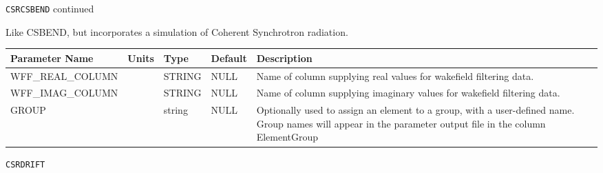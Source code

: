 \newpage
\begin{center}{\Large\verb|CSRCSBEND| continued}\end{center}
Like CSBEND, but incorporates a simulation of Coherent Synchrotron radiation.
\\
\begin{tabular}{|l|l|l|l|p{\descwidth}|} \hline
Parameter Name & Units & Type & Default & Description \\ \hline 
WFF\_REAL\_COLUMN &  & STRING &   NULL            & Name of column supplying real values for wakefield filtering data.  \\ \hline 
WFF\_IMAG\_COLUMN &  & STRING &   NULL            & Name of column supplying imaginary values for wakefield filtering data.  \\ \hline 
GROUP &  & string & NULL & Optionally used to assign an element to a group, with a user-defined name.  Group names will appear in the parameter output file in the column ElementGroup  \\ \hline 
\end{tabular}

\vspace*{0.5in}

\newpage
\begin{center}{\Large\verb|CSRDRIFT|}\end{center}
